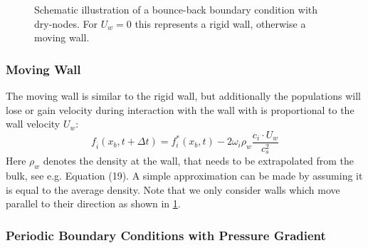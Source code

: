 \begin{figure}[ht!]
    \centering
    \caption[Schematic illustration of a bounce-back boundary condition with dry-nodes]{Schematic illustration of a bounce-back boundary condition with dry-nodes. For $U_w=0$ this represents a rigid wall, otherwise a moving wall.}
    \label{fig:boundary:bounce-back}
\end{figure}

\subsubsection{Moving Wall}

The moving wall is similar to the rigid wall, but additionally the populations will lose or gain velocity during interaction with the wall with is proportional to the wall velocity $U_w$:
\begin{equation}
    f_{\overline{i}}(x_b,t+\Delta t) = f_i^*(x_b,t) - 2\omega_i\rho_w \frac{c_i \cdot U_w}{c_s^2}
    \label{eq:boundary:moving}
\end{equation}
Here $\rho_w$ denotes the density at the wall, that needs to be extrapolated from the bulk, see e.g. \cite{zou1997} Equation (19). A simple approximation can be made by assuming it is equal to the average density. Note that we only consider walls which move parallel to their direction as shown in \cref{fig:boundary:bounce-back}.

\subsubsection{Periodic Boundary Conditions with Pressure Gradient}


